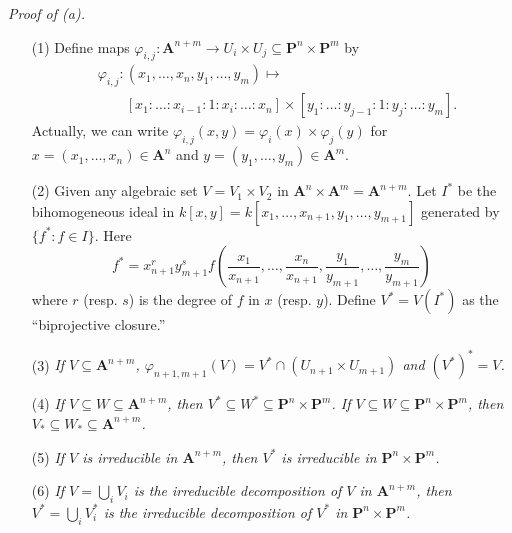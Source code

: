 \documentclass{article}
\begin{document}
\emph{Proof of (a).}
\begin{enumerate}
\item[(1)]
  Define maps
  $\varphi_{i,j}: \mathbf{A}^{n+m}
  \to
  U_i \times U_j
  \subseteq
  \mathbf{P}^{n} \times \mathbf{P}^{m}$
  by
  \begin{align*}
    &
    \varphi_{i,j}:
    (x_1, \ldots, x_{n}, y_1, \ldots, y_{m})
    \mapsto \\
    &\qquad
      [x_1 : \ldots : x_{i-1} : 1 : x_{i} : \ldots : x_{n}] \times
      [y_1 : \ldots : y_{j-1} : 1 : y_{j} : \ldots : y_{m}].
  \end{align*}
  Actually, we can write
  $\varphi_{i,j}(x, y) = \varphi_i(x) \times \varphi_j(y)$
  for $x = (x_1, \ldots, x_{n}) \in \mathbf{A}^{n}$ and
  $y = (y_1, \ldots, y_{m}) \in \mathbf{A}^{m}$.

\item[(2)]
  Given any algebraic set $V = V_1 \times V_2$ in
  $\mathbf{A}^{n} \times \mathbf{A}^{m} = \mathbf{A}^{n+m}$.
  Let $I^{*}$ be the bihomogeneous ideal in
  $k[x,y] = k[x_1, \ldots, x_{n+1}, y_1, \ldots, y_{m+1}]$
  generated by $\{ f^{*} : f \in I \}$.
  Here
  \[
    f^{*}
    =
    x_{n+1}^{r} y_{m+1}^{s}
    f\left( \frac{x_1}{x_{n+1}}, \ldots, \frac{x_{n}}{x_{n+1}},
      \frac{y_1}{y_{m+1}}, \ldots, \frac{y_{m}}{y_{m+1}} \right)
  \]
  where $r$ (resp. $s$) is the degree of $f$ in $x$ (resp. $y$).
  Define $V^{*} = V(I^{*})$ as the ``biprojective closure.''

\item[(3)]
  \emph{If $V \subseteq \mathbf{A}^{n+m}$,
  $\varphi_{n+1,m+1}(V) = V^{*} \cap (U_{n+1} \times U_{m+1})$
  and $(V^{*})^{*}= V$.}

\item[(4)]
  \emph{If $V \subseteq W \subseteq \mathbf{A}^{n+m}$,
  then $V^{*} \subseteq W^{*} \subseteq \mathbf{P}^{n} \times \mathbf{P}^{m}$.
  If $V \subseteq W \subseteq \mathbf{P}^{n} \times \mathbf{P}^{m}$,
  then $V_{*} \subseteq W_{*} \subseteq \mathbf{A}^{n+m}$.}

\item[(5)]
  \emph{If $V$ is irreducible in $\mathbf{A}^{n+m}$,
  then $V^{*}$ is irreducible in $\mathbf{P}^{n} \times \mathbf{P}^{m}$.}

\item[(6)]
  \emph{If $V = \bigcup_{i} V_i$ is the irreducible decomposition of $V$ in $\mathbf{A}^{n+m}$,
  then $V^{*} = \bigcup_{i} V_i^{*}$ is the irreducible decomposition of $V^{*}$
  in $\mathbf{P}^{n} \times \mathbf{P}^{m}$.}


\end{enumerate}
\end{document}
